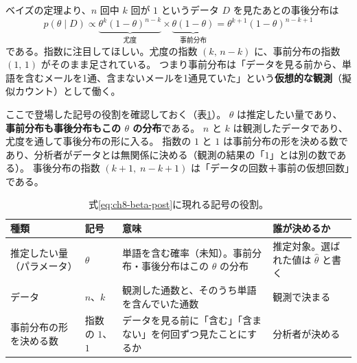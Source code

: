 ベイズの定理より、$n$ 回中 $k$ 回が $1$ というデータ $D$ を見たあとの事後分布は
\begin{equation}
  p(\theta \mid D) \propto \underbrace{\theta^k(1 - \theta)^{n-k}}_{\text{尤度}} \times \underbrace{\theta(1 - \theta)}_{\text{事前分布}}
  = \theta^{k + 1}(1 - \theta)^{n - k + 1}
  \label{eq:ch8-beta-post}
\end{equation}
である。指数に注目してほしい。尤度の指数 $(k,\, n - k)$ に、事前分布の指数 $(1,\, 1)$ がそのまま足されている。
つまり事前分布は「データを見る前から、単語を含むメールを1通、含まないメールを1通見ていた」という\textbf{仮想的な観測}（擬似カウント）として働く。

ここで登場した記号の役割を確認しておく（表\ref{tab:ch8-symbols}）。
$\theta$ は推定したい量であり、\textbf{事前分布も事後分布もこの $\theta$ の分布}である。
$n$ と $k$ は観測したデータであり、尤度を通して事後分布の形に入る。
指数の $1$ と $1$ は事前分布の形を決める数であり、分析者がデータとは無関係に決める（観測の結果の「$1$」とは別の数である）。
事後分布の指数 $(k + 1,\; n - k + 1)$ は「データの回数＋事前の仮想回数」である。

\begin{table}[H]
  \centering
  \caption{式\eqref{eq:ch8-beta-post}に現れる記号の役割。}
  \label{tab:ch8-symbols}
  \small
  \begin{tabular}{p{3.2cm}|p{2.0cm}|p{6.0cm}|p{2.4cm}}
    \hline
    種類 & 記号 & 意味 & 誰が決めるか \\
    \hline\hline
    推定したい量（パラメータ） & $\theta$ & 単語を含む確率（未知）。事前分布・事後分布はこの $\theta$ の分布 & 推定対象。選ばれた値は $\hat{\theta}$ と書く \\
    \hline
    データ & $n$、$k$ & 観測した通数と、そのうち単語を含んでいた通数 & 観測で決まる \\
    \hline
    事前分布の形を決める数 & 指数の $1$、$1$ & データを見る前に「含む」「含まない」を何回ずつ見たことにするか & 分析者が決める \\
    \hline
  \end{tabular}
\end{table}

